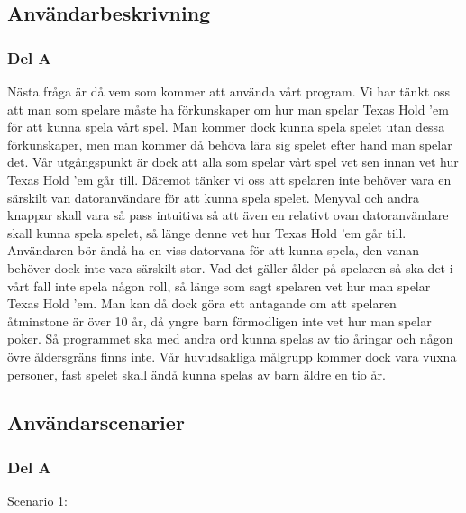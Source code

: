 \documentclass[10pt,twoside,a4paper]{article}
\begin{document}
\subsection*{Användarbeskrivning}

\subsubsection*{Del A}

Nästa fråga är då vem som kommer att använda vårt program. Vi har tänkt oss
att man som spelare måste ha förkunskaper om hur man spelar Texas Hold ’em
för att kunna spela vårt spel. Man kommer dock kunna spela spelet utan
dessa förkunskaper, men man kommer då behöva lära sig spelet efter hand man
spelar det. Vår utgångspunkt är dock att alla som spelar vårt spel vet sen
innan vet hur Texas Hold ’em går till. Däremot tänker vi oss att spelaren
inte behöver vara en särskilt van datoranvändare för att kunna spela
spelet. Menyval och andra knappar skall vara så pass intuitiva så att även
en relativt ovan datoranvändare skall kunna spela spelet, så länge denne
vet hur Texas Hold ’em går till. Användaren bör ändå ha en viss datorvana
för att kunna spela, den vanan behöver dock inte vara särskilt stor. Vad
det gäller ålder på spelaren så ska det i vårt fall inte spela någon roll,
så länge som sagt spelaren vet hur man spelar Texas Hold ’em. Man kan då
dock göra ett antagande om att spelaren åtminstone är över 10 år, då yngre
barn förmodligen inte vet hur man spelar poker. Så programmet ska med andra
ord kunna spelas av tio åringar och någon övre åldersgräns finns inte. Vår
huvudsakliga målgrupp kommer dock vara vuxna personer, fast spelet skall
ändå kunna spelas av barn äldre en tio år.

\subsection*{Användarscenarier}

\subsubsection*{Del A}

Scenario 1:
\end{document}

